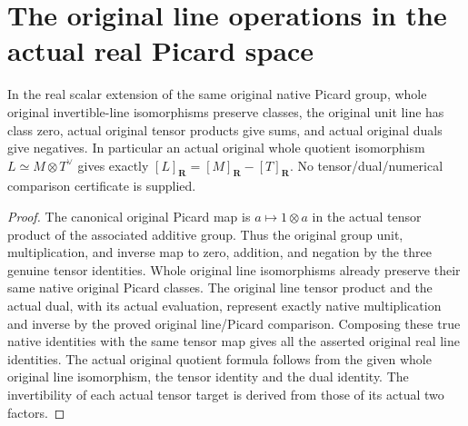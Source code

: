 \section{The original line operations in the actual real Picard space}
\label{sec:native-real-picard-operations}

\begin{theorem}
\label{thm:native-real-picard-operations}
\leanok
{}
In the real scalar extension of the same original native Picard
group, whole original invertible-line isomorphisms preserve classes,
the original unit line has class zero, actual original tensor
products give sums, and actual original duals give negatives.
In particular an actual original whole quotient isomorphism
$L\simeq M\otimes T^\vee$ gives exactly
$[L]_{\mathbf R}=[M]_{\mathbf R}-[T]_{\mathbf R}$.
No tensor/dual/numerical comparison certificate is supplied.
\end{theorem}

\begin{proof}
The canonical original Picard map is $a\mapsto1\otimes a$ in
the actual tensor product of the associated additive group.
Thus the original group unit, multiplication, and inverse map
to zero, addition, and negation by the three genuine tensor
identities. Whole original line isomorphisms already preserve
their same native original Picard classes. The original line
tensor product and the actual dual, with its actual evaluation,
represent exactly native multiplication and inverse by the
proved original line/Picard comparison. Composing these true
native identities with the same tensor map gives all the
asserted original real line identities. The actual original
quotient formula follows from the given whole original line
isomorphism, the tensor identity and the dual identity. The
invertibility of each actual tensor target is derived from
those of its actual two factors.
\end{proof}
